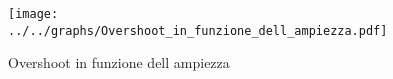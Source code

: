 \begin{figure}[h] \centering \texttt{[image: ../../graphs/Overshoot\_in\_funzione\_dell\_ampiezza.pdf]}\caption{Overshoot in funzione dell ampiezza}\label{gr:Overshoot_in_funzione_dell_ampiezza} \end{figure}
